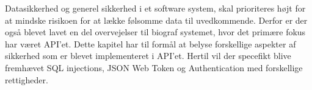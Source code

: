 ﻿Datasikkerhed og generel sikkerhed i et software system, 
skal prioriteres højt for at mindske risikoen for at lække følsomme data til uvedkommende. 
Derfor er der også blevet lavet en del overvejelser 
til biograf systemet, hvor det primære fokus har været API'et.
Dette kapitel har til formål at belyse forskellige aspekter af sikkerhed som er blevet implementeret i API'et.
Hertil vil der specefikt blive fremhævet SQL injections, JSON Web Token og Authentication med forskellige rettigheder.